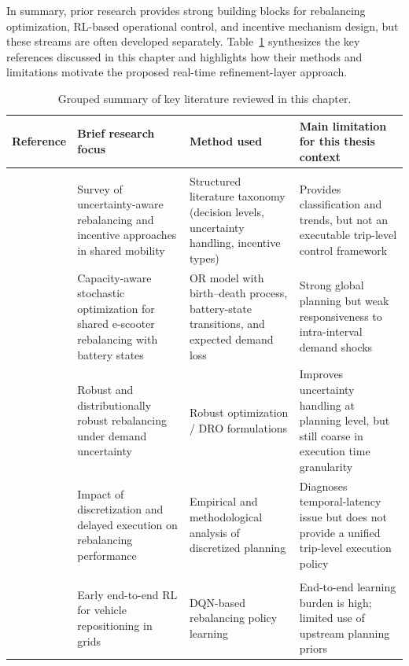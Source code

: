 In summary, prior research provides strong building blocks for rebalancing optimization, RL-based operational control, and incentive mechanism design, but these streams are often developed separately. Table~\ref{tab:lr-summary} synthesizes the key references discussed in this chapter and highlights how their methods and limitations motivate the proposed real-time refinement-layer approach.

\begin{table}[p]
\centering
\scriptsize
\setlength{\tabcolsep}{4pt}
\caption{Grouped summary of key literature reviewed in this chapter.}
\label{tab:lr-summary}
\begin{tabularx}{\textwidth}{>{\raggedright\arraybackslash}p{2.2cm}>{\raggedright\arraybackslash}X>{\raggedright\arraybackslash}p{3.0cm}>{\raggedright\arraybackslash}X}
\toprule
\textbf{Reference} & \textbf{Brief research focus} & \textbf{Method used} & \textbf{Main limitation for this thesis context} \\
\midrule
\multicolumn{4}{l}{\textbf{A. Tactical Optimization and Uncertainty-Aware Rebalancing}} \\
\midrule
\textcite{gao2025uncertainties} & Survey of uncertainty-aware rebalancing and incentive approaches in shared mobility & Structured literature taxonomy (decision levels, uncertainty handling, incentive types) & Provides classification and trends, but not an executable trip-level control framework \\
\textcite{momen2025} & Capacity-aware stochastic optimization for shared e-scooter rebalancing with battery states & OR model with birth--death process, battery-state transitions, and expected demand loss & Strong global planning but weak responsiveness to intra-interval demand shocks \\
\textcite{chen2024optimizing} & Robust and distributionally robust rebalancing under demand uncertainty & Robust optimization / DRO formulations & Improves uncertainty handling at planning level, but still coarse in execution time granularity \\
\textcite{liang2025} & Impact of discretization and delayed execution on rebalancing performance & Empirical and methodological analysis of discretized planning & Diagnoses temporal-latency issue but does not provide a unified trip-level execution policy \\
\midrule
\multicolumn{4}{l}{\textbf{B. RL Applications for Operational Execution}} \\
\midrule
\textcite{wen2017} & Early end-to-end RL for vehicle repositioning in grids & DQN-based rebalancing policy learning & End-to-end learning burden is high; limited use of upstream planning priors \\

\end{tabularx}
\end{table}
